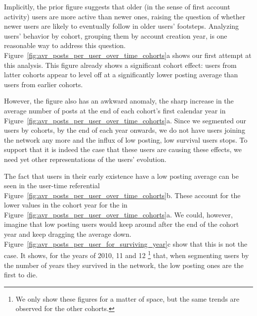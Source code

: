 

Implicitly, the prior figure suggests that older (in the sense of first account activity) users are more active than newer ones, raising the question of whether newer users
are likely to eventually follow in older users' footsteps.  Analyzing users' behavior by cohort, grouping them by account creation year, is one reasonable way to address this question.  Figure~\ref{fig:avr_posts_per_user_over_time_cohorts}a shows our first attempt at this analysis.  This figure already shows a significant cohort effect: users from latter cohorts appear to level off at a significantly lower posting average than users from earlier cohorts.  

However, the figure also has an awkward anomaly, the sharp increase in the average number of posts at the end of each cohort's first calendar year in Figure~\ref{fig:avr_posts_per_user_over_time_cohorts}a.  Since we segmented our users by cohorts, by the end of each year onwards, we do not have users joining the network any more and the influx of low posting, low survival users stops. To support that it is indeed the case that these users are causing these effects, we need yet other representations of the users' evolution.

The fact that users in their early existence have a low posting average can be seen in the user-time referential Figure~\ref{fig:avr_posts_per_user_over_time_cohorts}b. These account for the lower values in the cohort year for the in Figure~\ref{fig:avr_posts_per_user_over_time_cohorts}a. We could, however, imagine that low posting users would keep around after the end of the cohort year and keep dragging the average down. Figure~\ref{fig:avr_posts_per_user_for_surviving_year}c show that this is not the case. It shows, for the years of 2010, 11 and 12 \footnote{We only show these figures for a matter of space, but the same trends are observed for the other cohorts.} that, when segmenting users by the number of years they survived in the network, the low posting ones are the first to die.



